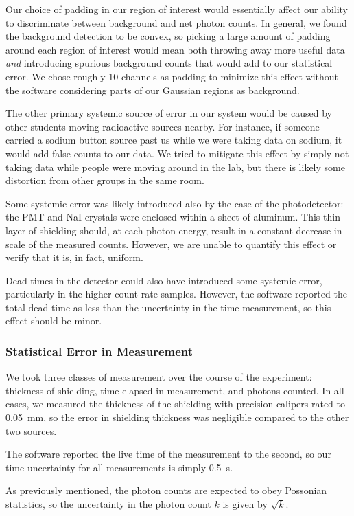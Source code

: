 \documentclass[letter]{article}
\begin{document}
Our choice of padding in our region of interest would essentially affect our ability to discriminate between background and net photon counts. In general, we found the background detection to be convex, so picking a large amount of padding around each region of interest would mean both throwing away more useful data \textit{and} introducing spurious background counts that would add to our statistical error. We chose roughly 10 channels as padding to minimize this effect without the software considering parts of our Gaussian regions as background.

The other primary systemic source of error in our system would be caused by other students moving radioactive sources nearby. For instance, if someone carried a sodium button source past us while we were taking data on sodium, it would add false counts to our data. We tried to mitigate this effect by simply not taking data while people were moving around in the lab, but there is likely some distortion from other groups in the same room.

Some systemic error was likely introduced also by the case of the photodetector: the PMT and NaI crystals were enclosed within a sheet of aluminum. This thin layer of shielding should, at each photon energy, result in a constant decrease in scale of the measured counts. However, we are unable to quantify this effect or verify that it is, in fact, uniform. 

Dead times in the detector could also have introduced some systemic error, particularly in the higher count-rate samples. However, the software reported the total dead time as less than the uncertainty in the time measurement, so this effect should be minor.


\subsubsection{Statistical Error in Measurement}

We took three classes of measurement over the course of the experiment: thickness of shielding, time elapsed in measurement, and photons counted. In all cases, we measured the thickness of the shielding with precision calipers rated to \qty{0.05}{\mm}, so the error in shielding thickness was negligible compared to the other two sources.

The software reported the live time of the measurement to the second, so our time uncertainty for all measurements is simply \qty{0.5}{\s}.

As previously mentioned, the photon counts are expected to obey Possonian statistics, so the uncertainty in the photon count $k$ is given by $\sqrt{k}$. 
\end{document}
